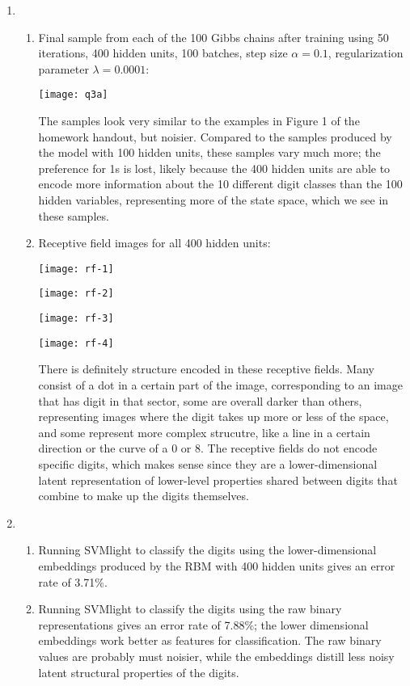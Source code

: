 \documentclass[12pt]{article}
\begin{document}
\begin{enumerate}
\begin{enumerate}
\end{enumerate}

\item %
\begin{enumerate}
\item
Final sample from each of the 100 Gibbs chains after training using 50 iterations, 400 hidden units, 100 batches, step size $\alpha=0.1$, regularization parameter $\lambda=0.0001$:
\begin{center}
\texttt{[image: q3a]}
\end{center}
The samples look very similar to the examples in Figure 1 of the homework handout, but noisier. Compared to the samples produced by the model with 100 hidden units, these samples vary much more; the preference for 1s is lost, likely because the 400 hidden units are able to encode more information about the 10 different digit classes than the 100 hidden variables, representing more of the state space, which we see in these samples.

\item
Receptive field images for all 400 hidden units:
\begin{center}
\texttt{[image: rf-1]}
\end{center}
\begin{center}
\texttt{[image: rf-2]}
\end{center}
\begin{center}
\texttt{[image: rf-3]}
\end{center}
\begin{center}
\texttt{[image: rf-4]}
\end{center}
There is definitely structure encoded in these receptive fields. Many consist of a dot in a certain part of the image, corresponding to an image that has digit in that sector, some are overall darker than others, representing images where the digit takes up more or less of the space, and some represent more complex strucutre, like a line in a certain direction or the curve of a 0 or 8. The receptive fields do not encode specific digits, which makes sense since they are a lower-dimensional latent representation of lower-level properties shared between digits that combine to make up the digits themselves.

\end{enumerate}

\item %
\begin{enumerate}
\item Running SVMlight to classify the digits using the lower-dimensional embeddings produced by the RBM with 400 hidden units gives an error rate of 3.71\%.
\item Running SVMlight to classify the digits using the raw binary representations gives an error rate of 7.88\%; the lower dimensional embeddings work better as features for classification. The raw binary values are probably must noisier, while the embeddings distill less noisy latent structural properties of the digits.
\end{enumerate}

\end{enumerate}
\end{document}
